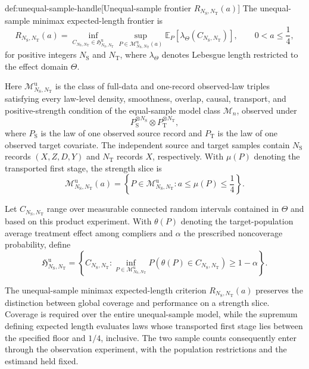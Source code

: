 \documentclass[11pt]{article}
\begin{document}
\begin{definitionv}{def:unequal-sample-handle}[Unequal-sample frontier \(R_{N_{\mathrm S},N_{\mathrm T}}(a)\)]
The unequal-sample minimax expected-length frontier is
\[
R_{N_{\mathrm S},N_{\mathrm T}}(a)
=
\inf_{C_{N_{\mathrm S},N_{\mathrm T}}\in
\mathfrak H^{\mathrm u}_{N_{\mathrm S},N_{\mathrm T}}}
\sup_{P\in\mathcal M^{\mathrm u}_{N_{\mathrm S},N_{\mathrm T}}(a)}
\mathbb E_P\!\left[
\lambda_{\Theta}\!\left(C_{N_{\mathrm S},N_{\mathrm T}}\right)
\right],
\qquad
0<a\le\frac14,
\]
for positive integers \(N_{\mathrm S}\) and \(N_{\mathrm T}\), where \(\lambda_{\Theta}\) denotes Lebesgue length restricted to the effect domain \(\Theta\).

Here \(\mathcal M^{\mathrm u}_{N_{\mathrm S},N_{\mathrm T}}\) is the class of full-data and one-record observed-law triples satisfying every law-level density, smoothness, overlap, causal, transport, and positive-strength condition of the equal-sample model class \(\mathcal M_n\), observed under
\[
P_{\mathrm S}^{\otimes N_{\mathrm S}}
\otimes
P_{\mathrm T}^{\otimes N_{\mathrm T}},
\]
where \(P_{\mathrm S}\) is the law of one observed source record and \(P_{\mathrm T}\) is the law of one observed target covariate. The independent source and target samples contain \(N_{\mathrm S}\) records \((X,Z,D,Y)\) and \(N_{\mathrm T}\) records \(X\), respectively. With \(\mu(P)\) denoting the transported first stage, the strength slice is
\[
\mathcal M^{\mathrm u}_{N_{\mathrm S},N_{\mathrm T}}(a)
=
\left\{
P\in\mathcal M^{\mathrm u}_{N_{\mathrm S},N_{\mathrm T}}:
a\le\mu(P)\le\frac14
\right\}.
\]

Let \(C_{N_{\mathrm S},N_{\mathrm T}}\) range over measurable connected random intervals contained in \(\Theta\) and based on this product experiment. With \(\theta(P)\) denoting the target-population average treatment effect among compliers and \(\alpha\) the prescribed noncoverage probability, define
\[
\mathfrak H^{\mathrm u}_{N_{\mathrm S},N_{\mathrm T}}
=
\left\{
C_{N_{\mathrm S},N_{\mathrm T}}:
\inf_{P\in\mathcal M^{\mathrm u}_{N_{\mathrm S},N_{\mathrm T}}}
P\!\left(
\theta(P)\in C_{N_{\mathrm S},N_{\mathrm T}}
\right)
\ge1-\alpha
\right\}.
\]
\end{definitionv}

The unequal-sample minimax expected-length criterion \(R_{N_{\mathrm S},N_{\mathrm T}}(a)\) preserves the distinction between global coverage and performance on a strength slice. Coverage is required over the entire unequal-sample model, while the supremum defining expected length evaluates laws whose transported first stage lies between the specified floor and \(1/4\), inclusive. The two sample counts consequently enter through the observation experiment, with the population restrictions and the estimand held fixed.
\end{document}
